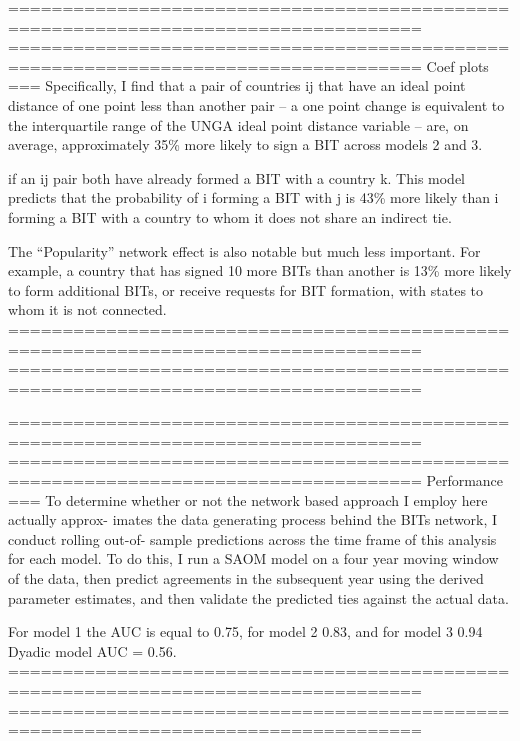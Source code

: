 ====================================================================================
====================================================================================
Coef plots
===
Specifically, I find that a pair of countries ij that have an ideal point distance of one point less than another pair – a one point change is equivalent to the interquartile range of the UNGA ideal point distance variable – are, on average, approximately 35\% more likely to sign a BIT across models 2 and 3.

if an ij pair both have already formed a BIT with a country k. This model predicts that the probability of i forming a BIT with j is 43\% more likely than i forming a BIT with a country to whom it does not share an indirect tie. 

The “Popularity” network effect is also notable but much less important. For example, a country that has signed 10 more BITs than another is 13\% more likely to form additional BITs, or receive requests for BIT formation, with states to whom it is not connected.
====================================================================================
====================================================================================

====================================================================================
====================================================================================
Performance
===
To determine whether or not the network based approach I employ here actually approx- imates the data generating process behind the BITs network, I conduct rolling out-of- sample predictions across the time frame of this analysis for each model. To do this, I run a SAOM model on a four year moving window of the data, then predict agreements in the subsequent year using the derived parameter estimates, and then validate the predicted ties against the actual data. 

For model 1 the AUC is equal to 0.75, for model 2 0.83, and for model 3 0.94
Dyadic model AUC = 0.56.
====================================================================================
====================================================================================